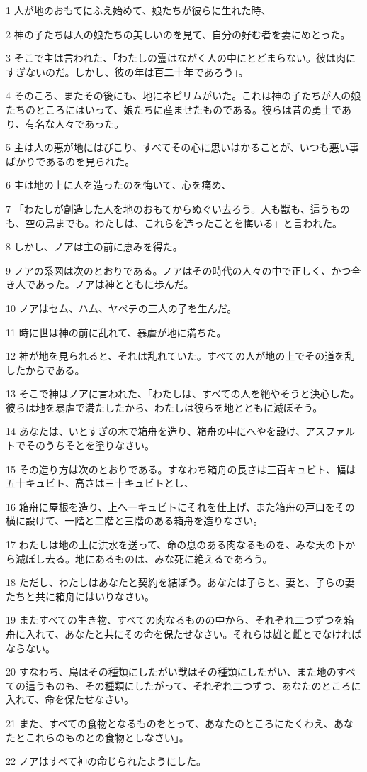 \par 1 人が地のおもてにふえ始めて、娘たちが彼らに生れた時、
\par 2 神の子たちは人の娘たちの美しいのを見て、自分の好む者を妻にめとった。
\par 3 そこで主は言われた、「わたしの霊はながく人の中にとどまらない。彼は肉にすぎないのだ。しかし、彼の年は百二十年であろう」。
\par 4 そのころ、またその後にも、地にネピリムがいた。これは神の子たちが人の娘たちのところにはいって、娘たちに産ませたものである。彼らは昔の勇士であり、有名な人々であった。
\par 5 主は人の悪が地にはびこり、すべてその心に思いはかることが、いつも悪い事ばかりであるのを見られた。
\par 6 主は地の上に人を造ったのを悔いて、心を痛め、
\par 7 「わたしが創造した人を地のおもてからぬぐい去ろう。人も獣も、這うものも、空の鳥までも。わたしは、これらを造ったことを悔いる」と言われた。
\par 8 しかし、ノアは主の前に恵みを得た。
\par 9 ノアの系図は次のとおりである。ノアはその時代の人々の中で正しく、かつ全き人であった。ノアは神とともに歩んだ。
\par 10 ノアはセム、ハム、ヤペテの三人の子を生んだ。
\par 11 時に世は神の前に乱れて、暴虐が地に満ちた。
\par 12 神が地を見られると、それは乱れていた。すべての人が地の上でその道を乱したからである。
\par 13 そこで神はノアに言われた、「わたしは、すべての人を絶やそうと決心した。彼らは地を暴虐で満たしたから、わたしは彼らを地とともに滅ぼそう。
\par 14 あなたは、いとすぎの木で箱舟を造り、箱舟の中にへやを設け、アスファルトでそのうちそとを塗りなさい。
\par 15 その造り方は次のとおりである。すなわち箱舟の長さは三百キュビト、幅は五十キュビト、高さは三十キュビトとし、
\par 16 箱舟に屋根を造り、上へ一キュビトにそれを仕上げ、また箱舟の戸口をその横に設けて、一階と二階と三階のある箱舟を造りなさい。
\par 17 わたしは地の上に洪水を送って、命の息のある肉なるものを、みな天の下から滅ぼし去る。地にあるものは、みな死に絶えるであろう。
\par 18 ただし、わたしはあなたと契約を結ぼう。あなたは子らと、妻と、子らの妻たちと共に箱舟にはいりなさい。
\par 19 またすべての生き物、すべての肉なるものの中から、それぞれ二つずつを箱舟に入れて、あなたと共にその命を保たせなさい。それらは雄と雌とでなければならない。
\par 20 すなわち、鳥はその種類にしたがい獣はその種類にしたがい、また地のすべての這うものも、その種類にしたがって、それぞれ二つずつ、あなたのところに入れて、命を保たせなさい。
\par 21 また、すべての食物となるものをとって、あなたのところにたくわえ、あなたとこれらのものとの食物としなさい」。
\par 22 ノアはすべて神の命じられたようにした。

